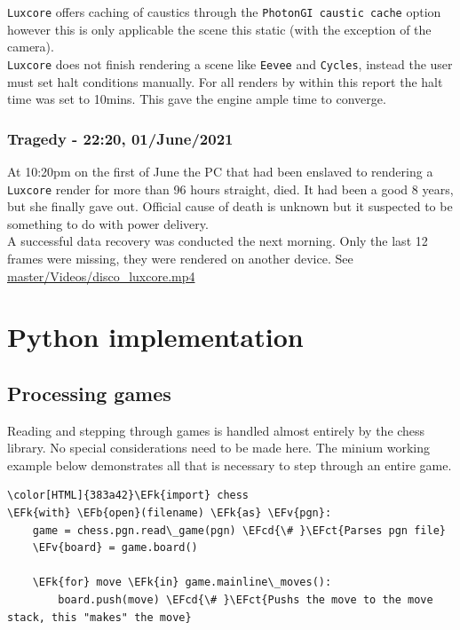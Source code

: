\documentclass[11pt]{article}
\newcommand{\EFk}[1]{\textcolor{EFk}{#1}} %
\newcommand{\EFb}[1]{\textcolor{EFb}{#1}} %
\newcommand{\EFct}[1]{\textcolor{EFct}{#1}} %
\newcommand{\EFv}[1]{\textcolor{EFv}{#1}} %
\newcommand{\EFcd}[1]{\textcolor{EFcd}{#1}} %
\begin{document}
\texttt{Luxcore} offers caching of caustics through the \texttt{PhotonGI caustic cache} option
however this is only applicable the scene this static (with the exception of the
camera).\\

\texttt{Luxcore} does not finish rendering a scene like \texttt{Eevee} and \texttt{Cycles}, instead
the user must set halt conditions manually. For all renders by within this
report the halt time was set to 10mins. This gave the engine ample time to
converge.
\subsubsection{Tragedy - 22:20, 01/June/2021}
\label{sec:org975f010}
At 10:20pm on the first of June the PC that had been enslaved to rendering a
\texttt{Luxcore} render for more than 96 hours straight, died. It had been a good 8
years, but she finally gave out. Official cause of death is unknown but it
suspected to be something to do with power delivery.\\

A successful data recovery was conducted the next morning. Only the last 12
frames were missing, they were rendered on another device. See
\href{https://github.com/Jake-Moss/blender-chess/blob/master/Videos/disco\_luxcore.mp4}{master/Videos/disco\_luxcore.mp4 }
\section{Python implementation}
\label{sec:org8c77b35}
\subsection{Processing games}
\label{sec:org27493ed}
Reading and stepping through games is handled almost entirely by the chess
library. No special considerations need to be made here. The minium working
example below demonstrates all that is necessary to step through an entire game.

\begin{Code}
\begin{Verbatim}[]
\color[HTML]{383a42}\EFk{import} chess
\EFk{with} \EFb{open}(filename) \EFk{as} \EFv{pgn}:
    game = chess.pgn.read\_game(pgn) \EFcd{\# }\EFct{Parses pgn file}
    \EFv{board} = game.board()

    \EFk{for} move \EFk{in} game.mainline\_moves():
        board.push(move) \EFcd{\# }\EFct{Pushs the move to the move stack, this "makes" the move}
\end{Verbatim}
\end{Code}
\end{document}
